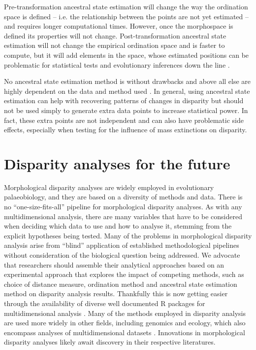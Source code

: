 \documentclass[12pt,letterpaper]{article}
\begin{document}
Pre-transformation ancestral state estimation will change the way the ordination space is defined -- i.e. the relationship between the points are not yet estimated -- and requires longer computational times.
However, once the morphospace is defined its properties will not change.
Post-transformation ancestral state estimation will not change the empirical ordination space and is faster to compute, but it will add elements in the space, whose estimated positions can be problematic for statistical tests and evolutionary inferences down the line \citep{lloyd2018}.

No ancestral state estimation method is without drawbacks and above all else are highly dependent on the data and method used \cite{Louca2019}.
In general, using ancestral state estimation can help with recovering patterns of changes in disparity but should not be used simply to generate extra data points to increase statistical power.
In fact, these extra points are not independent and can also have problematic side effects, especially when testing for the influence of mass extinctions on disparity.

\section{Disparity analyses for the future} \label{section:future}

\noindent Morphological disparity analyses are widely employed in evolutionary palaeobiology, and they are based on a diversity of methods and data.
There is no ``one-size-fits-all'' pipeline for morphological disparity analyses.
As with any multidimensional analysis, there are many variables that have to be considered when deciding which data to use and how to analyse it, stemming from the explicit hypotheses being tested.
Many of the problems in morphological disparity analysis arise from ``blind'' application of established methodological pipelines without consideration of the biological question being addressed.
We advocate that researchers should assemble their analytical approaches based on an experimental approach that explores the impact of competing methods, such as choice of distance measure, ordination method and ancestral state estimation method on disparity analysis results.
Thankfully this is now getting easier through the availability of diverse well documented R packages for multidimensional analysis \citep{Navarro2003-vz, Bouxin2005-wk, oksanen2007vegan, Harmon2008-gq, lloyd2016, Guillerme2018-uc}.
Many of the methods employed in disparity analysis are used more widely in other fields, including genomics and ecology, which also encompass analyses of multidimensional datasets \citep{Donohue2013-bg, Saupe2015-vm, Canter2018-hk, mammola2019}.
Innovations in morphological disparity analyses likely await discovery in their respective literatures.
\end{document}
